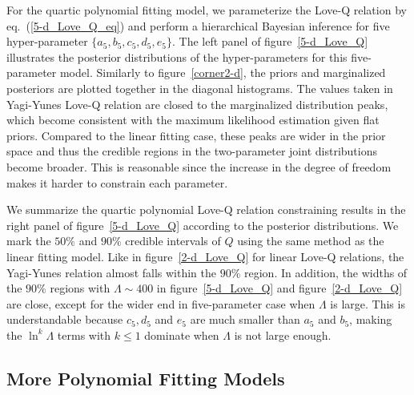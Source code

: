 \documentclass[a4paper,11pt]{article}
\begin{document}
For the quartic polynomial fitting model, we parameterize the Love-Q relation by eq.~(\ref{5-d_Love_Q_eq}) and perform a hierarchical Bayesian inference for five hyper-parameter $\{a_5, b_5, c_5, d_5, e_5\}$. The left panel of figure~\ref{5-d_Love_Q} illustrates the posterior distributions of the hyper-parameters for this five-parameter model. Similarly to figure~\ref{corner2-d}, the priors and marginalized posteriors are plotted together in the diagonal histograms. 
The values taken in Yagi-Yunes Love-Q relation are closed to the marginalized distribution peaks, which become consistent with the maximum likelihood estimation given flat priors. Compared to the linear fitting case, these peaks are wider in the prior space and thus the credible regions in the two-parameter joint distributions become broader. 
This is reasonable since the increase in the degree of freedom makes it harder to constrain each parameter.

We summarize the quartic polynomial Love-Q relation constraining results in the right panel of figure~\ref{5-d_Love_Q} according to the posterior distributions. We mark the $50\%$ and $90\%$ credible intervals of $Q$ using the same method as the linear fitting model. Like in figure~\ref{2-d_Love_Q} for linear Love-Q relations, the Yagi-Yunes relation almost falls within the $90\%$ region. In addition, the widths of the $90\%$ regions with $\Lambda \sim 400$ in figure~\ref{5-d_Love_Q} and figure~\ref{2-d_Love_Q} are close, except for the wider end in five-parameter case when $\Lambda$ is large. This is understandable because $c_5, d_5$ and $e_5$ are much smaller than $a_5$ and $b_5$, making the $\ln^k\Lambda$ terms with $k\leq1$ dominate when $\Lambda$ is not large enough.

\subsection{More Polynomial Fitting Models}
\label{sec4_3}
\end{document}
